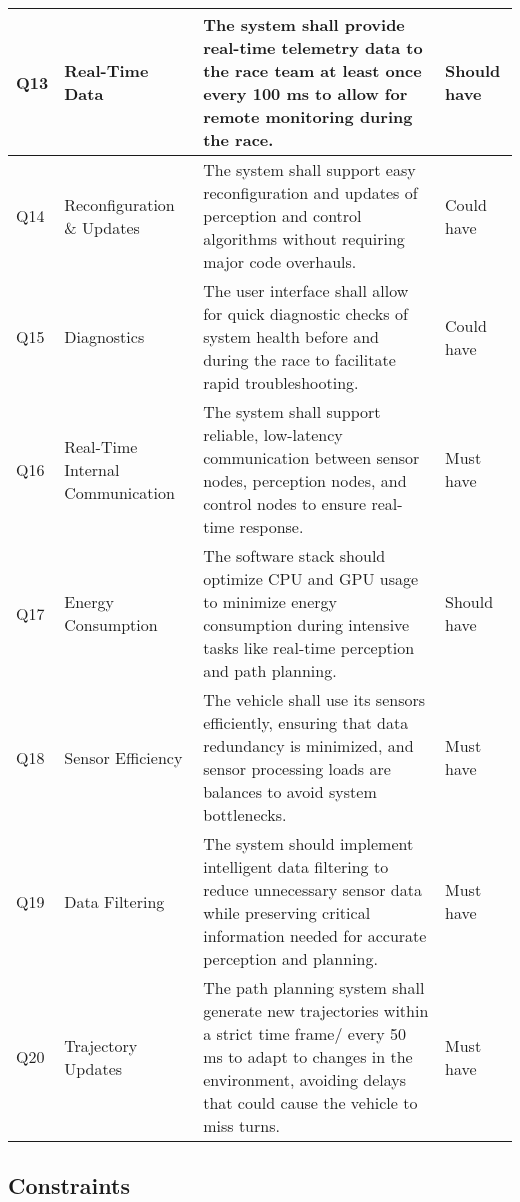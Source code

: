 \begin{center}
\begin{longtable}{ | m{2em} | m{10em} | m{16em} | m{8em} | }
		\hline
		Q13 & Real-Time Data & The system shall provide real-time telemetry data to the race team at least once every 100 ms to allow for remote monitoring during the race. & Should have \\
		\hline
		Q14 & Reconfiguration \& Updates & The system shall support easy reconfiguration and updates of perception and control algorithms without requiring major code overhauls. & Could have \\
		\hline
		Q15 & Diagnostics & The user interface shall allow for quick diagnostic checks of system health before and during the race to facilitate rapid troubleshooting. & Could have \\
		\hline
		Q16 & Real-Time Internal Communication & The system shall support reliable, low-latency communication between sensor nodes, perception nodes, and control nodes to ensure real-time response. & Must have \\
		\hline
		Q17 & Energy Consumption & The software stack should optimize CPU and GPU usage to minimize energy consumption during intensive tasks like real-time perception and path planning. & Should have \\
		\hline
		Q18 & Sensor Efficiency & The vehicle shall use its sensors efficiently, ensuring that data redundancy is minimized, and sensor processing loads are balances to avoid system bottlenecks. & Must have \\
		\hline
		Q19 & Data Filtering & The system should implement intelligent data filtering to reduce unnecessary sensor data while preserving critical information needed for accurate perception and planning. & Must have \\
		\hline
		Q20 & Trajectory Updates & The path planning system shall generate new trajectories within a strict time frame/ every 50 ms to adapt to changes in the environment, avoiding delays that could cause the vehicle to miss turns. & Must have 
	\end{longtable}
\end{center}


\subsection{Constraints}

